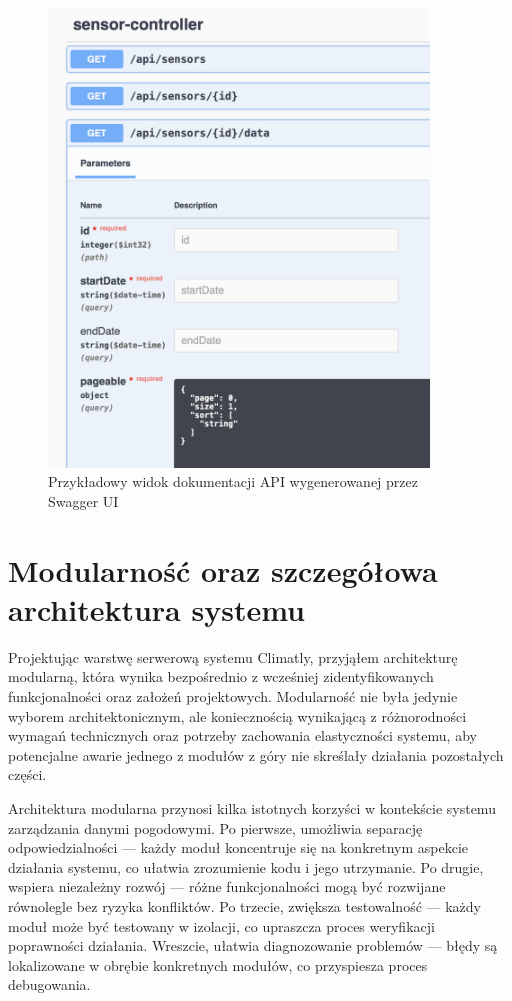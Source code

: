 \documentclass[a4paper,12pt,openany]{book}
\begin{document}
\begin{figure}[H]
    \centering
    \includegraphics[width=0.9\textwidth]{swagger.png}
    \caption{Przykładowy widok dokumentacji API wygenerowanej przez Swagger UI}
    \label{fig:swagger-ui}
\end{figure}

\chapter{Modularność oraz szczegółowa architektura systemu}

Projektując warstwę serwerową systemu Climatly, przyjąłem architekturę modularną, która wynika bezpośrednio z wcześniej zidentyfikowanych funkcjonalności oraz założeń projektowych. Modularność nie była jedynie wyborem architektonicznym, ale koniecznością wynikającą z różnorodności wymagań technicznych oraz potrzeby zachowania elastyczności systemu, aby potencjalne awarie jednego z modułów z góry nie skreślały działania pozostałych części.

Architektura modularna przynosi kilka istotnych korzyści w kontekście systemu zarządzania danymi pogodowymi. Po pierwsze, umożliwia separację odpowiedzialności — każdy moduł koncentruje się na konkretnym aspekcie działania systemu, co ułatwia zrozumienie kodu i jego utrzymanie. Po drugie, wspiera niezależny rozwój — różne funkcjonalności mogą być rozwijane równolegle bez ryzyka konfliktów. Po trzecie, zwiększa testowalność — każdy moduł może być testowany w izolacji, co upraszcza proces weryfikacji poprawności działania. Wreszcie, ułatwia diagnozowanie problemów — błędy są lokalizowane w obrębie konkretnych modułów, co przyspiesza proces debugowania.
\end{document}
